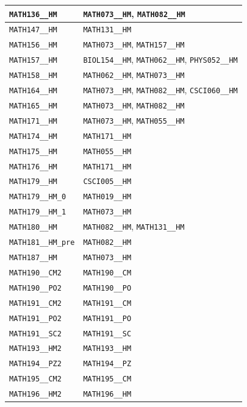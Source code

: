 \begin{longtable}{|p{4.4in}|p{4.4in}|}
    \verb|MATH136__HM| & \verb|MATH073__HM|, \verb|MATH082__HM|\\\hline
    \verb|MATH147__HM| & \verb|MATH131__HM|\\\hline
    \verb|MATH156__HM| & \verb|MATH073__HM|, \verb|MATH157__HM|\\\hline
    \verb|MATH157__HM| & \verb|BIOL154__HM|, \verb|MATH062__HM|, \verb|PHYS052__HM|\\\hline
    \verb|MATH158__HM| & \verb|MATH062__HM|, \verb|MATH073__HM|\\\hline
    \verb|MATH164__HM| & \verb|MATH073__HM|, \verb|MATH082__HM|, \verb|CSCI060__HM|\\\hline
    \verb|MATH165__HM| & \verb|MATH073__HM|, \verb|MATH082__HM|\\\hline
    \verb|MATH171__HM| & \verb|MATH073__HM|, \verb|MATH055__HM|\\\hline
    \verb|MATH174__HM| & \verb|MATH171__HM|\\\hline
    \verb|MATH175__HM| & \verb|MATH055__HM|\\\hline
    \verb|MATH176__HM| & \verb|MATH171__HM|\\\hline
    \verb|MATH179__HM| & \verb|CSCI005__HM|\\\hline
    \verb|MATH179__HM_0| & \verb|MATH019__HM|\\\hline
    \verb|MATH179__HM_1| & \verb|MATH073__HM|\\\hline
    \verb|MATH180__HM| & \verb|MATH082__HM|, \verb|MATH131__HM|\\\hline
    \verb|MATH181__HM_pre| & \verb|MATH082__HM|\\\hline
    \verb|MATH187__HM| & \verb|MATH073__HM|\\\hline
    \verb|MATH190__CM2| & \verb|MATH190__CM|\\\hline
    \verb|MATH190__PO2| & \verb|MATH190__PO|\\\hline
    \verb|MATH191__CM2| & \verb|MATH191__CM|\\\hline
    \verb|MATH191__PO2| & \verb|MATH191__PO|\\\hline
    \verb|MATH191__SC2| & \verb|MATH191__SC|\\\hline
    \verb|MATH193__HM2| & \verb|MATH193__HM|\\\hline
    \verb|MATH194__PZ2| & \verb|MATH194__PZ|\\\hline
    \verb|MATH195__CM2| & \verb|MATH195__CM|\\\hline
    \verb|MATH196__HM2| & \verb|MATH196__HM|\\\hline

\end{longtable}
